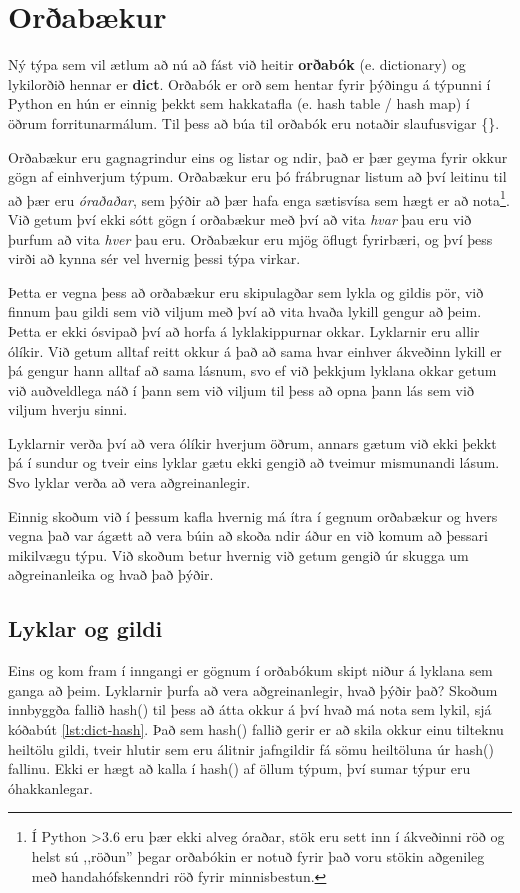 
\chapter{Orðabækur}\label{k:orðabækur}
Ný týpa sem vil ætlum að nú að fást við heitir \textbf{orðabók} (e. dictionary)  og lykilorðið hennar er \textbf{dict}.
Orðabók er orð sem hentar fyrir þýðingu á týpunni í Python en hún er einnig þekkt sem hakkatafla (e. hash table / hash map) í öðrum forritunarmálum.
Til þess að búa til orðabók eru notaðir slaufusvigar \{\}.

Orðabækur eru gagnagrindur eins og listar og ndir, það er þær geyma fyrir okkur gögn af einhverjum týpum.
Orðabækur eru þó frábrugnar listum að því leitinu til að þær eru \textit{óraðaðar}, sem þýðir að þær hafa enga sætisvísa sem hægt er að nota\footnote{Í Python >3.6 eru þær ekki alveg óraðar, stök eru sett inn í ákveðinni röð og helst sú ,,röðun'' þegar orðabókin er notuð fyrir það voru stökin aðgenileg með handahófskenndri röð fyrir minnisbestun.}.
Við getum því ekki sótt gögn í orðabækur með því að vita \textit{hvar} þau eru við þurfum að vita \textit{hver} þau eru.
Orðabækur eru mjög öflugt fyrirbæri, og því þess virði að kynna sér vel hvernig þessi týpa virkar.

Þetta er vegna þess að orðabækur eru skipulagðar sem lykla og gildis pör, við finnum þau gildi sem við viljum með því að vita hvaða lykill gengur að þeim.
Þetta er ekki ósvipað því að horfa á lyklakippurnar okkar.
Lyklarnir eru allir ólíkir.
Við getum alltaf reitt okkur á það að sama hvar einhver ákveðinn lykill er þá gengur hann alltaf að sama lásnum, svo ef við þekkjum lyklana okkar getum við auðveldlega náð í þann sem við viljum til þess að opna þann lás sem við viljum hverju sinni.

Lyklarnir verða því að vera ólíkir hverjum öðrum, annars gætum við ekki þekkt þá í sundur og tveir eins lyklar gætu ekki gengið að tveimur mismunandi lásum.
Svo lyklar verða að vera aðgreinanlegir.

Einnig skoðum við í þessum kafla hvernig má ítra í gegnum orðabækur og hvers vegna það var ágætt að vera búin að skoða ndir áður en við komum að þessari mikilvægu týpu.
Við skoðum betur hvernig við getum gengið úr skugga um aðgreinanleika og hvað það þýðir.
\section{Lyklar og gildi}
Eins og kom fram í inngangi er gögnum í orðabókum skipt niður á lyklana sem ganga að þeim.
Lyklarnir þurfa að vera aðgreinanlegir, hvað þýðir það?
Skoðum innbyggða fallið hash() til þess að átta okkur á því hvað má nota sem lykil, sjá kóðabút \ref{lst:dict-hash}.
Það sem hash() fallið gerir er að skila okkur einu tilteknu heiltölu gildi, tveir hlutir sem eru álitnir jafngildir fá sömu heiltöluna úr hash() fallinu.
Ekki er hægt að kalla í hash() af öllum týpum, því sumar týpur eru óhakkanlegar.

